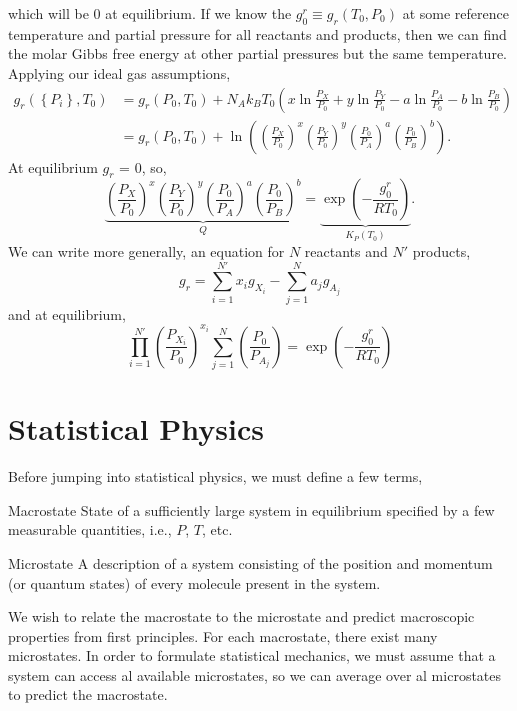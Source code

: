 \documentclass{book}
\begin{document}
which will be 0 at equilibrium. If we know the $g^r_0 \equiv g_r(T_0, P_0)$ at some reference temperature and partial pressure for all reactants and products, then we can find the molar Gibbs free energy at other partial pressures but the same temperature. Applying our ideal gas assumptions,
\begin{equation}
	\begin{split}
		g_r\left(\left\{P_i\right\},T_0\right) & = g_r(P_0,T_0) + N_Ak_BT_0\left(x\ln\frac{P_X}{P_0} + y\ln\frac{P_Y}{P_0} - a\ln\frac{P_A}{P_0} - b\ln\frac{P_B}{P_0}\right) \\ 
		& = g_r(P_0, T_0) + \ln\left(\left(\frac{P_X}{P_0}\right)^x\left(\frac{P_Y}{P_0}\right)^y\left(\frac{P_0}{P_A}\right)^a\left(\frac{P_0}{P_B}\right)^b\right).
	\end{split}
\end{equation}
At equilibrium $g_r$ = 0, so,
\begin{equation}
	\underbrace{\left(\frac{P_X}{P_0}\right)^x\left(\frac{P_Y}{P_0}\right)^y\left(\frac{P_0}{P_A}\right)^a\left(\frac{P_0}{P_B}\right)^b}_{Q} = \underbrace{\exp\left(-\frac{g_0^r}{RT_0}\right)}_{K_P(T_0)}.
\end{equation}
We can write more generally, an equation for $N$ reactants and $N'$ products,
\begin{equation}
	g_r = \sum_{i=1}^{N'}x_ig_{X_i} - \sum_{j=1}^Na_jg_{A_j}
\end{equation}
and at equilibrium,
\begin{equation}
	\prod_{i=1}^{N'}\left(\frac{P_{X_i}}{P_0}\right)^{x_i}\sum_{j=1}^{N}\left(\frac{P_0}{P_{A_j}}\right) = \exp\left(-\frac{g_0^r}{RT_0}\right)
\end{equation}
\chapter{Statistical Physics}
Before jumping into statistical physics, we must define a few terms,
\begin{Definitions}{Macrostate}{}
	State of a sufficiently large system in equilibrium specified by a few measurable quantities, i.e., $P$, $T$, etc.
\end{Definitions}
\begin{Definitions}{Microstate}{}
	A description of a system consisting of the position and momentum (or quantum states) of every molecule present in the system.
\end{Definitions}
We wish to relate the macrostate to the microstate and predict macroscopic properties from first principles. For each macrostate, there exist many microstates. In order to formulate statistical mechanics, we must assume that a system can access al available microstates, so we can average over al microstates to predict the macrostate.
\end{document}
